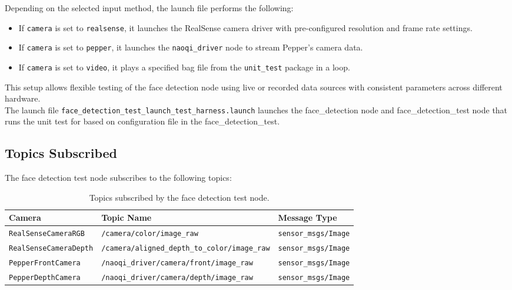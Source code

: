 \documentclass{CSSRforAfrica}
\begin{document}
{Depending on the selected input method, the launch file performs the following:

\begin{itemize}
	\item If \texttt{camera} is set to \texttt{realsense}, it launches the RealSense camera driver with pre-configured resolution and frame rate settings.
	\item If \texttt{camera} is set to \texttt{pepper}, it launches the \texttt{naoqi\_driver} node to stream Pepper’s camera data.
	\item If \texttt{camera} is set to \texttt{video}, it plays a specified bag file from the \texttt{unit\_test} package in a loop.
\end{itemize}

This setup allows flexible testing of the face detection node using live or recorded data sources with consistent parameters across different hardware.\\

The launch file \texttt{face\_detection\_test\_launch\_test\_harness.launch} launches the face\_detection node and face\_detection\_test node that runs the unit test for based on configuration file in the face\_detection\_test.

\subsection*{Topics Subscribed}
The face detection test node subscribes to the following topics:

\begin{table}[!h]
	\centering
	{\fontsize{9.0}{12.0}\selectfont %
		\begin{tabularx}{\linewidth}{| l | l | X |}
			\hline
			\rowcolor{blue!20}
			\textbf{Camera} & \textbf{Topic Name} & \textbf{Message Type} \\
			\hline
			\texttt{RealSenseCameraRGB} & \texttt{/camera/color/image\_raw} & \texttt{sensor\_msgs/Image} \\
			\hline
			\texttt{RealSenseCameraDepth} & \texttt{/camera/aligned\_depth\_to\_color/image\_raw} & \texttt{sensor\_msgs/Image} \\
			\hline
			\texttt{PepperFrontCamera} & \texttt{/naoqi\_driver/camera/front/image\_raw} & \texttt{sensor\_msgs/Image} \\
			\hline
			\texttt{PepperDepthCamera} & \texttt{/naoqi\_driver/camera/depth/image\_raw} & \texttt{sensor\_msgs/Image} \\
			\hline
		\end{tabularx}
	}
	\caption{Topics subscribed by the face detection test node.}
\end{table}

}
\end{document}
